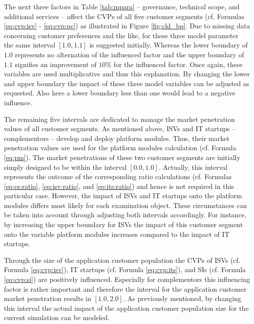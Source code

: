 The next three factors in Table \ref{tab:mpara} -- governance, technical scope, and additional services -- affect the \acp{CVP} of all five customer segments (cf. Formulas \ref{eq:cvp:isv} - \ref{eq:cvp:pc}) as illustrated in Figure \ref{fig:cld_bp}. Due to missing data concerning customer preferences and the like, for these three model parameter the same interval $[1.0,1.1]$ is suggested initially. Whereas the lower boundary of $1.0$ represents no alternation of the influenced factor and the upper boundary of $1.1$ signifies an improvement of $10\%$ for the influenced factor. Once again, these variables are used multiplicative and thus this explanation. By changing the lower and upper boundary the impact of these three model variables can be adjusted as requested. Also here a lower boundary less than one would lead to a negative influence.

The remaining five intervals are dedicated to manage the market penetration values of all customer segments. As mentioned above, \acp{ISV} and \ac{IT} startups -- complementors -- develop and deploy platform modules. Thus, their market penetration values are used for the platform modules calculation (cf. Formula \ref{eq:pm}). The market penetrations of these two customer segments are initially simply designed to be within the interval $[0.0,1.0]$. Actually, this interval represents the outcome of the corresponding ratio calculations (cf. Formulas \ref{eq:cs:ratio}, \ref{eq:isv:ratio}, and \ref{eq:its:ratio}) and hence is not required in this particular case. However, the impact of \acp{ISV} and \ac{IT} startups onto the platform modules differs most likely for each examination object. These circumstances can be taken into account through adjusting both intervals accordingly. For instance, by increasing the upper boundary for \acp{ISV} the impact of this customer segment onto the variable platform modules increases compared to the impact of \ac{IT} startups.

Through the size of the application customer population the \acp{CVP} of \acp{ISV} (cf. Formula \ref{eq:cvp:isv}), \ac{IT} startups (cf. Formula \ref{eq:cvp:its}), and \acp{SI} (cf. Formula \ref{eq:cvp:si}) are positively influenced. Especially for complementors this influencing factor is rather important and therefore the interval for the application customer market penetration results in $[1.0,2.0]$. As previously mentioned, by changing this interval the actual impact of the application customer population size for the current simulation can be modeled.


